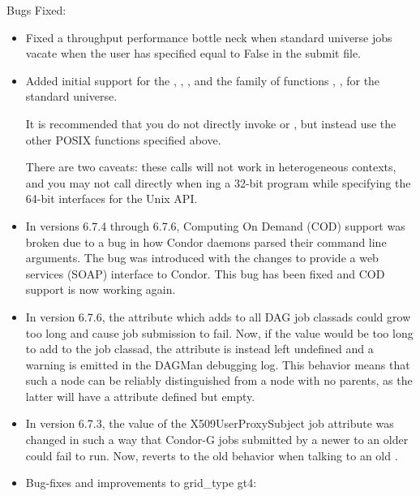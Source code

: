\noindent Bugs Fixed:

\begin{itemize}

\item Fixed a throughput performance bottle neck when standard universe
	jobs vacate when the user has specified  equal to
	False in the submit file.

\item Added initial support for the ,
	, , and the family of functions
	, ,  for the
	standard universe.  

	It is recommended that you do not directly invoke  
	or , but instead use the other POSIX functions
	specified above.

	There are two caveats: these calls will not work in heterogeneous
	contexts, and you may not call  directly when 
	ing a 32-bit program while specifying the 64-bit
	interfaces for the Unix API.

\item In versions 6.7.4 through 6.7.6, Computing On Demand (COD)
  support was broken due to a bug in how Condor daemons parsed their
  command line arguments.
  The bug was introduced with the changes to provide a web services
  (SOAP) interface to Condor.
  This bug has been fixed and COD support is now working again.

\item In version 6.7.6, the  attribute
which  adds to all DAG job classads could grow too long
and cause job submission to fail.  Now, if the
 value would be too long to add to the job
classad, the attribute is instead left undefined and a warning is
emitted in the DAGMan debugging log.  This behavior means that such a
node can be reliably distinguished from a node with no parents, as the
latter will have a  attribute defined but
empty.

\item In version 6.7.3, the value of the X509UserProxySubject job attribute
was changed in such a way that Condor-G jobs submitted by a newer
 to an older  could fail to run. Now,
 reverts to the old behavior when talking to an old
.

\item Bug-fixes and improvements to grid\_type gt4:


\end{itemize}

